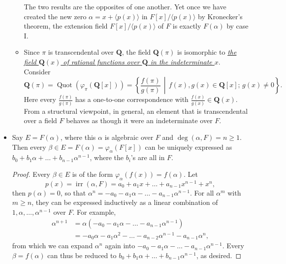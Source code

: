 \documentclass[11pt]{article}
\newcommand{\Q}{\mathbf{Q}}
\newcommand{\df}[1]{\ul{\textit{\textsf{#1}}}}
\newcommand{\la}{\langle}
\newcommand{\ra}{\rangle}
\newcommand{\Quot}{\operatorname{Quot}} %
\newcommand{\irr}{\operatorname{irr}}
\renewcommand{\phi}{\varphi}
\begin{document}
\begin{itemize}
\begin{itemize}
        The two results are the opposites of one another. Yet once we have created the new zero $\alpha = x + \la p(x) \ra$ in $F[x]/\la p(x) \ra$ by Kronecker's theorem, the extension field $F[x]/\la p(x) \ra$ of $F$ is exactly $F(\alpha)$ by case I. %
        \item Since $\pi$ is transcendental over $\Q$, the field $\Q(\pi)$ is isomorphic to \df{the field $\Q(x)$ of rational functions over $\Q$ in the indeterminate $x$}. Consider \[\Q(\pi) = \Quot(\phi_\pi(\Q[x])) = \left\{\frac{f(\pi)}{g(\pi)} \,\middle|\, f(x),g(x) \in \Q[x];\, g(x) \neq 0 \right\}.\] Here every $\frac{f(\pi)}{g(\pi)}$ has a one-to-one correspondence with $\frac{f(x)}{g(x)} \in \Q(x)$. From a structural viewpoint, in general, an element that is transcendental over a field $F$ behaves as though it were an indeterminate over $F$.
    \end{itemize}
    \item Say $E = F(\alpha)$, where this $\alpha$ is algebraic over $F$ and $\deg(\alpha,F) = n \geq 1$. Then every $\beta \in E = F(\alpha) = \phi_\alpha(F[x])$ can be uniquely expressed as $b_0 + b_1 \alpha + \dots + b_{n-1} \alpha^{n-1}$, where the $b_i$'s are all in $F$.
    \begin{proof}
        Every $\beta \in E$ is of the form $\phi_\alpha(f(x)) = f(\alpha)$. Let \[p(x) = \irr(\alpha,F) = a_0+a_1x+\dots+a_{n-1}x^{n-1}+x^n,\] then $p(\alpha) = 0$, so that $\alpha^n = -a_0-a_1 \alpha-\dots -a_{n-1} \alpha^{n-1}$. For all $\alpha^m$ with $m \geq n$, they can be expressed inductively as a  linear combination of $1,\alpha,\dots,\alpha^{n-1}$ over $F$. For example,
        \begin{align*}
            \alpha^{n+1} & = \alpha (-a_0-a_1 \alpha-\dots -a_{n-1} \alpha^{n-1}) \\ & = -a_0 \alpha - a_1 \alpha^2 - \dots - a_{n-2} \alpha^{n-1} - a_{n-1} \alpha^n,
        \end{align*}
        from which we can expand $\alpha^n$ again into $-a_0-a_1 \alpha-\dots -a_{n-1} \alpha^{n-1}$. Every $\beta = f(\alpha)$ can thus be reduced to $b_0 + b_1 \alpha + \dots + b_{n-1} \alpha^{n-1}$, as desired.
        

\end{proof}
\end{itemize}
\end{document}
